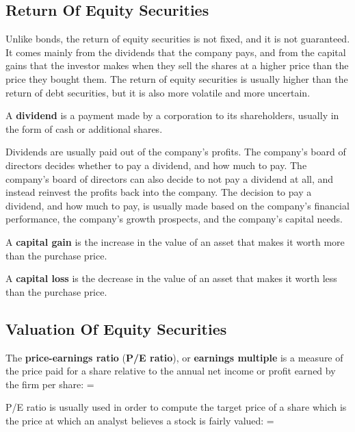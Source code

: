 \subsection{Return Of Equity Securities}

Unlike bonds, the return of equity securities is not fixed, and it is not guaranteed. It comes mainly from the
dividends that the company pays, and from the capital gains that the investor makes when they sell the shares at a
higher price than the price they bought them. The return of equity securities is usually higher than the return of
debt securities, but it is also more volatile and more uncertain.

\bd[Dividend]
A \textbf{dividend} is a payment made by a corporation to its shareholders, usually in the form of cash or additional
shares.
\ed

Dividends are usually paid out of the company's profits. The company's board of directors decides whether to pay a
dividend, and how much to pay. The company's board of directors can also decide to not pay a dividend at all, and
instead reinvest the profits back into the company. The decision to pay a dividend, and how much to pay, is usually
made based on the company's financial performance, the company's growth prospects, and the company's capital needs.

A \textbf{capital gain} is the increase in the value of an asset that makes it worth more than the purchase price.
\ed

A \textbf{capital loss} is the decrease in the value of an asset that makes it worth less than the purchase price.
\ed

\subsection{Valuation Of Equity Securities}

The \textbf{price-earnings ratio} (\textbf{P/E ratio}), or \textbf{earnings multiple} is a measure of the price paid
for a share relative to the annual net income or profit earned by the firm per share:
\bse
{} = 
\ese
\ed

P/E ratio is usually used in order to compute the target price of a share which is the price at which an analyst
believes a stock is fairly valued:
\bse
{} =  \times {}
\ese


